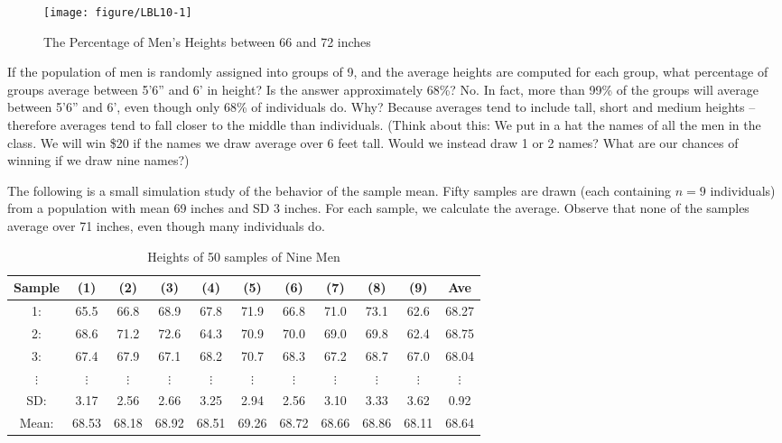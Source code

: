 \documentclass[11pt, chapterprefix=true]{scrbook}\usepackage[]{graphicx}\usepackage[]{color}
\begin{document}
\begin{figure}[ht]
\caption{The Percentage of Men's Heights between 66 and 72 inches}



{\centering \texttt{[image: figure/LBL10-1]} 

}




\end{figure}

If the population of men is randomly assigned into groups of 9, and the average heights are computed for each group, what percentage of groups average between 5'6'' and 6' in height?    Is the answer approximately 68\%?  No.  In fact, more than 99\% of the groups will average between 5'6'' and 6', even though only 68\% of individuals do.  Why?  Because averages tend to include tall, short and medium heights -- therefore averages tend to fall closer to the middle than individuals.   (Think about this:  We put in a hat the names of all the men in the class.  We will win \$20 if the names we draw average over 6 feet tall.  Would we instead draw 1 or 2 names?  What are our chances of winning if we draw nine names?)  

The following is a small simulation study of the behavior of the sample mean.  Fifty samples are drawn (each containing $n = 9$ individuals) from a population with mean 69 inches and SD 3 inches.  For each sample, we calculate the average.  Observe that none of the samples average over 71 inches, even though many individuals do.

\begin{table}[ht]
\caption{Heights of 50 samples of Nine Men}
\begin{tabular}{@{} ccccccccccc @{}} \hline
Sample & (1)&(2)&(3)&(4)&(5)&(6)&(7)&(8)&(9)& Ave \\ \hline
1: &65.5&66.8&68.9&67.8&71.9&66.8&71.0&73.1&62.6&68.27 \\
2: &68.6&71.2&72.6&64.3&70.9&70.0&69.0&69.8&62.4&68.75 \\
3: &67.4&67.9&67.1&68.2&70.7&68.3&67.2&68.7&67.0&68.04 \\
$\vdots$ & $\vdots$ & $\vdots$ & $\vdots$ & $\vdots$ & $\vdots$ & $\vdots$ & $\vdots$ & $\vdots$ & $\vdots$ & $\vdots$ \\ \hline
SD: &3.17&2.56&2.66&3.25&2.94&2.56&3.10&3.33&3.62 & 0.92 \\
Mean: &68.53&68.18&68.92&68.51&69.26&68.72&68.66&68.86&68.11& 68.64 \\ \hline
\end{tabular}
\end{table}
\end{document}
